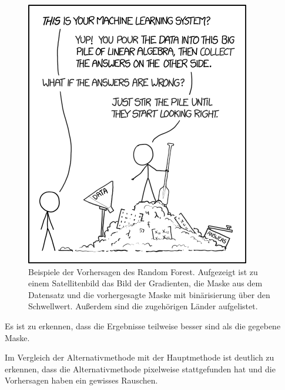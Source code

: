 \begin{figure}
    \centering
    \includegraphics[width=\textwidth]{images/placeholder.png}
    \caption{Beispiele der Vorhersagen des Random Forest. %
    Aufgezeigt ist zu einem Satellitenbild das Bild der Gradienten, %
    die Maske aus dem Datensatz und %
    die vorhergesagte Maske mit binärisierung über den Schwellwert. %
    Außerdem sind die zugehörigen Länder aufgelistet.}
    \label{fig:beispiele_rndf}
\end{figure}

Es ist zu erkennen, dass die Ergebnisse teilweise besser sind als die gegebene Maske.

Im Vergleich der Alternativmethode mit der Hauptmethode ist deutlich zu erkennen, 
dass die Alternativmethode pixelweise stattgefunden hat und die Vorhersagen haben ein gewisses Rauschen.

